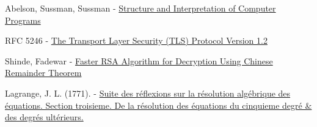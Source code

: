 \documentclass[a4paper,11pt,twocolumn]{article}
\begin{document}
\begin{thebibliography}{1}
 Abelson, Sussman, Sussman -  \href{https://mitpress.mit.edu/sicp/chapter1/footnode.html#2413}{Structure and Interpretation of Computer Programs}

 RFC 5246 - \href{https://www.ietf.org/rfc/rfc5246.txt}{The Transport Layer Security (TLS) Protocol Version 1.2}

 Shinde, Fadewar -  \href{http://www.techscience.com/doi/10.3970/icces.2008.005.255.pdf}{Faster RSA Algorithm for Decryption Using Chinese Remainder Theorem}

 Lagrange, J. L. (1771). - \href{https://books.google.com/books?id=_-U_AAAAYAAJ&pg=PA138#v=onepage&q&f=false}{Suite des réflexions sur la résolution algébrique des équations. Section troisieme. De la résolution des équations du cinquieme degré & des degrés ultérieurs.}

\end{thebibliography}
\end{document}
